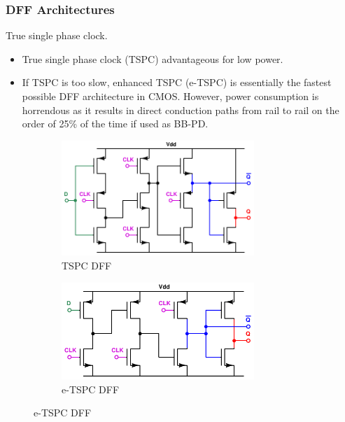 \documentclass[t, screen, aspectratio=43]{beamer}
\begin{document}
\begin{frame}
	\frametitle{DFF Architectures}
	\begin{block}{True single phase clock.}
	\tiny
	\begin{itemize}[itemsep=4pt,label=\protect---]
		\item True single phase clock (TSPC) advantageous for low power.
		\item If TSPC is too slow, enhanced TSPC (e-TSPC) is essentially the fastest possible DFF architecture in CMOS. However, power consumption is horrendous as it results in direct conduction paths from rail to rail on the order of 25\% of the time if used as BB-PD.

	\end{itemize}
	\begin{figure}[htb!]
	    \centering
	    \begin{subfigure}{0.5\textwidth}
	        \centering
	        \includegraphics[width=0.8\textwidth, angle=0]{tspc_dff.pdf}
	        \caption{TSPC DFF}
	    \end{subfigure}%
	    \begin{subfigure}{0.5\textwidth}
	        \centering
	        \center\includegraphics[width=0.8\textwidth, angle=0]{etspc_dff.pdf}
	        \caption{e-TSPC DFF}
	    \end{subfigure}
	\end{figure}

	\end{block}	
\end{frame}
\end{document}
